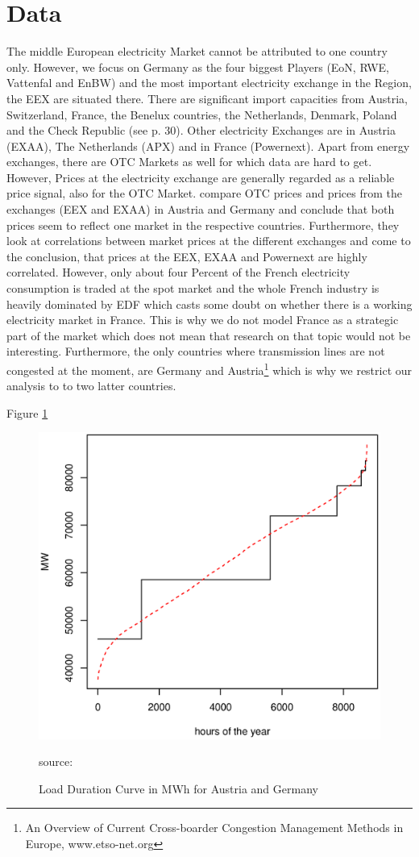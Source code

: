 \section{Data}

The middle European electricity Market cannot be attributed to one country only. However, we focus on Germany as the four biggest Players (EoN, RWE, Vattenfal and EnBW) and the most important electricity exchange in the Region, the EEX are situated there. There are significant import capacities from Austria, Switzerland, France, the Benelux countries, the Netherlands, Denmark, Poland and the Check Republic (see \cite{Ellersdorfer2005}p. 30). Other electricity Exchanges are in Austria (EXAA), The Netherlands (APX) and in France (Powernext). Apart from energy exchanges, there are OTC Markets as well for which data are hard to get. However, Prices at the electricity exchange are generally regarded as a reliable price signal, also for the OTC Market. \cite{Holler2006} compare OTC prices and prices from the exchanges (EEX and EXAA) in Austria and Germany and conclude that both prices seem to reflect one market in the respective countries. Furthermore, they look at correlations between market prices at the different exchanges and come to the conclusion, that prices at the EEX, EXAA and Powernext are highly correlated. However, only about four Percent of the French electricity consumption is traded at the spot market and the whole French industry is heavily dominated by EDF which casts some doubt on whether there is a working electricity market in France. This is why we do not model France as a strategic part of the market which does not mean that research on that topic would not be interesting. Furthermore, the only countries where transmission lines are not congested at the moment, are Germany and Austria\footnote{An Overview of Current Cross-boarder Congestion Management Methods in Europe, www.etso-net.org} which is why we restrict our analysis to to two latter countries. 

Figure \ref{fig:ldc}

\begin{figure}[h]
\centering
\includegraphics[width=.5\textwidth]{data/ldc}
      \label{fig:ldc}
      \caption{Load Duration Curve in MWh for Austria and Germany}
      source: 
\end{figure}


